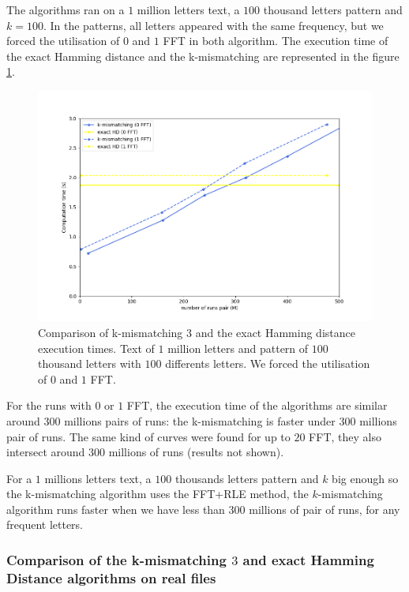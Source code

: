\documentclass[preprint,12pt]{elsarticle}
\begin{document}
The algorithms ran on a $1$ million letters text, a $100$ thousand letters pattern and $k = 100$.
In the patterns, all letters appeared with the same frequency,
but we forced the utilisation of $0$ and $1$ FFT in both algorithm.
The execution time of the exact Hamming distance and the k-mismatching are represented in the figure \ref{Opti01FFT}.


\begin{figure}[h]
\centering
\includegraphics[scale=0.45]{./figures/Opti01FFT.png}
\caption{Comparison of k-mismatching $3$ and the exact Hamming distance execution times.
Text of $1$ million letters and pattern of $100$ thousand letters with $100$ differents letters.
We forced the utilisation of $0$ and $1$ FFT.}
\label{Opti01FFT}
\end{figure}

For the runs with $0$ or $1$ FFT,
the execution time of the algorithms are similar around $300$ millions pairs of runs:
the k-mismatching is faster under $300$ millions pair of runs.
The same kind of curves were found for up to $20$ FFT, they also intersect around $300$ millions of runs
(results not shown).

For a $1$ millions letters text, a $100$ thousands letters pattern
and $k$ big enough so the k-mismatching algorithm uses the FFT+RLE method,
the $k$-mismatching algorithm runs faster when we have less than $300$ millions of pair of runs,
for any frequent letters.



\subsubsection*{Comparison of the k-mismatching $3$ and exact Hamming Distance algorithms on real files}
\end{document}
